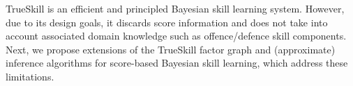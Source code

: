 TrueSkill is an efficient and principled Bayesian skill learning
system.  However, due to its design goals, it discards score
information and does not take into account associated domain knowledge
such as offence/defence skill components.  Next,
we propose extensions of the TrueSkill factor graph and (approximate)
inference algorithms for score-based Bayesian skill learning, which
address these limitations.
